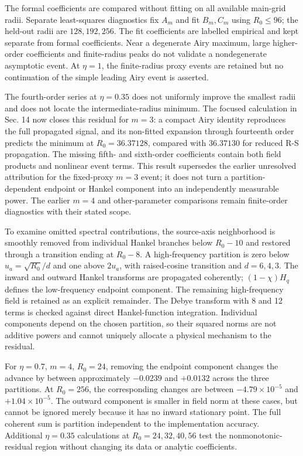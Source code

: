 The formal coefficients are compared without fitting on all available
main-grid radii. Separate least-squares diagnostics fix $A_m$ and fit
$B_m,C_m$ using $R_0\leq96$; the held-out radii are $128,192,256$.
The fit coefficients are labelled empirical and kept separate from
formal coefficients. Near a degenerate Airy maximum, large higher-order
coefficients and finite-radius peaks do not validate a nondegenerate
asymptotic event. At $\eta=1$, the finite-radius proxy events are
retained but no continuation of the simple leading Airy event is asserted.

The fourth-order series at \(\eta=0.35\) does not uniformly improve the
smallest radii and does not locate the intermediate-radius minimum. The
focused calculation in Sec. 14 now closes this residual for \(m=3\): a
compact Airy identity reproduces the full propagated signal, and its
non-fitted expansion through fourteenth order predicts the minimum at
\(R_0=36.37128\), compared with \(36.37130\) for reduced R-S
propagation. The missing fifth- and sixth-order coefficients contain
both field products and nonlinear event terms. This result supersedes
the earlier unresolved attribution for the fixed-proxy \(m=3\) event; it
does not turn a partition-dependent endpoint or Hankel component into an
independently measurable power. The earlier \(m=4\) and other-parameter
comparisons remain finite-order diagnostics with their stated scope.

To examine omitted spectral contributions, the source-axis neighborhood
is smoothly removed from individual Hankel branches below $R_0-10$
and restored through a transition ending at $R_0-8$. A high-frequency
partition is zero below $u_a=\sqrt{R_0}/d$ and one above $2u_a$,
with raised-cosine transition and $d=6,4,3$. The inward and outward
Hankel transforms are propagated coherently; $(1-\chi)H_q$ defines
the low-frequency endpoint component. The remaining high-frequency
field is retained as an explicit remainder. The Debye transform with
8 and 12 terms is checked against direct Hankel-function integration.
Individual components depend on the chosen partition, so their squared
norms are not additive powers and cannot uniquely allocate a physical
mechanism to the residual.

For $\eta=0.7$, $m=4$, $R_0=24$, removing the endpoint component
changes the advance by between approximately $-0.0239$ and $+0.0132$
across the three partitions. At $R_0=256$, the corresponding changes
are between $-4.79\times10^{-5}$ and $+1.04\times10^{-5}$.
The outward component is smaller in field norm at these cases, but
cannot be ignored merely because it has no inward stationary point.
The full coherent sum is partition independent to the implementation
accuracy. Additional $\eta=0.35$ calculations at $R_0=24,32,40,56$
test the nonmonotonic-residual region without changing its data or
analytic coefficients.

